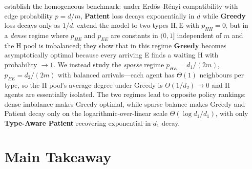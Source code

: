 \documentclass{article}
\theoremstyle{plain}
\theoremstyle{definition}
\begin{document}
\cite{akbarpour} establish the homogeneous benchmark: under Erd\H{o}s--R\'enyi compatibility with edge probability $p=d/m$, \textbf{Patient} loss decays exponentially in $d$ while \textbf{Greedy} loss decays only as $1/d$. \cite{ashlagi2023matching} extend the model to two types $\mathrm H,\mathrm E$ with $p_{HH}=0$, but in a \emph{dense} regime where $p_{HE}$ and $p_{EE}$ are constants in $(0,1]$ independent of $m$ and the H pool is imbalanced; they show that in this regime \textbf{Greedy} becomes asymptotically optimal because every arriving E finds a waiting H with probability $\to 1$. We instead study the \emph{sparse} regime $p_{HE}=d_1/(2m)$, $p_{EE}=d_2/(2m)$ with balanced arrivals---each agent has $\Theta(1)$ neighbours per type, so the H pool's average degree under Greedy is $\Theta(1/d_2)\to 0$ and H agents are essentially isolated. The two regimes lead to opposite policy rankings: dense imbalance makes Greedy optimal, while sparse balance makes Greedy and Patient decay only on the logarithmic-over-linear scale $\Theta(\log d_1/d_1)$, with only \textbf{Type-Aware Patient} recovering exponential-in-$d_1$ decay.


\section{Main Takeaway}\label{sec:takeaway}
\end{document}
